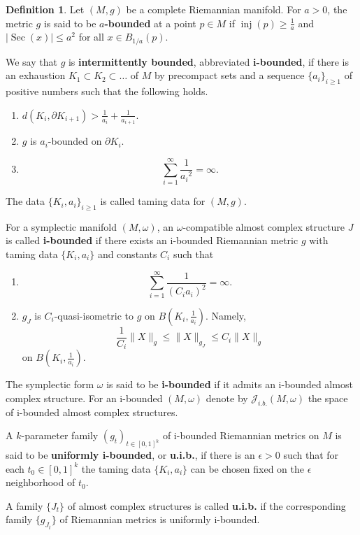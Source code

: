 \documentclass[11pt]{amsart}
\DeclareMathOperator{\Sec}{Sec}
\DeclareMathOperator{\inj}{inj}
\theoremstyle{definition}
\newtheorem{df}[tm]{Definition}
\theoremstyle{remark}
\begin{document}
\begin{df}\label{dfIntBounded}
Let $(M,g)$ be a complete Riemannian manifold. For $a>0$, the metric $g$ is said to be \textbf{$a$-bounded} at a point $p\in M$ if $\inj(p)\geq\frac1a$ and $|\Sec(x)|\leq a^2$ for all $x\in B_{1/a}(p)$.


We say that $g$ is \textbf{intermittently bounded}, abbreviated \textbf{i-bounded}, if there is an exhaustion $K_1\subset K_2\subset \dots$ of $M$ by precompact sets and a sequence $\{a_i\}_{i\geq 1}$ of positive numbers such that the following holds.
\begin{enumerate}
    \item $d( K_i,\partial K_{i+1})> \frac1{a_i}+\frac1{a_{i+1}}.$
    \item $g$ is $a_i$-bounded on $\partial K_i$.
    \item
        \begin{equation}\label{Eqtame}
            \sum_{i=1}^{\infty}\frac1{{a_i}^2}=\infty.
        \end{equation}
\end{enumerate}
The data $\{K_i,a_i\}_{i\geq 1}$ is called taming data for $(M,g)$.

For a symplectic manifold $(M,\omega)$, an $\omega$-compatible almost complex structure $J$ is called \textbf{i-bounded} if there exists an i-bounded Riemannian metric $g$ with taming data $\{K_i,a_i\}$ and constants $C_i$ such that
\begin{enumerate}
    \item
        \begin{equation}\label{Eqtame}
            \sum_{i=1}^{\infty}\frac1{{(C_ia_i)}^2}=\infty.
        \end{equation}
    \item
        $g_J$ is $C_i$-quasi-isometric to $g$ on $B\left(K_i,\frac1{a_i}\right)$. Namely,
        \[
            \frac1{C_i}\|X\|_g \leq \|X\|_{g_J}\leq C_i\|X\|_g
        \]
        on $B\left(K_i,\frac1{a_i}\right)$.
\end{enumerate}
The symplectic form $\omega$ is said to be \textbf{i-bounded} if it admits an i-bounded almost complex structure. For an i-bounded $(M,\omega)$ denote by $\mathcal{J}_{i.b.}(M,\omega)$ the space of i-bounded almost complex structures.

A $k$-parameter family $(g_t)_{t\in[0,1]^k}$ of i-bounded Riemannian metrics on $M$ is said to be \textbf{uniformly i-bounded}, or \textbf{u.i.b.}, if there is an $\epsilon>0$ such that for each $t_0\in [0,1]^k$ the taming data $\{K_i,a_i\}$ can be chosen fixed on the $\epsilon$ neighborhood of $t_0$.

A family $\{J_t\}$ of almost complex structures is called \textbf{u.i.b.} if the corresponding family $\{g_{J_t}\}$ of Riemannian metrics is uniformly i-bounded.
\end{df}
\end{document}
